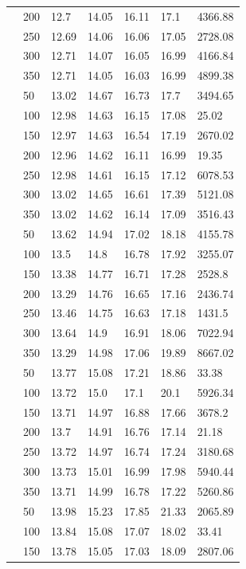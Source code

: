 \documentclass[12pt,a4paper,twoside,openany]{report}
\begin{document}
\begin{longtable}{@{} l l l l l l l @{}}
& 200 & 12.7 & 14.05 & 16.11 & 17.1 & 4366.88 \\
& 250 & 12.69 & 14.06 & 16.06 & 17.05 & 2728.08 \\
& 300 & 12.71 & 14.07 & 16.05 & 16.99 & 4166.84 \\
& 350 & 12.71 & 14.05 & 16.03 & 16.99 & 4899.38 \\
\hline
\pagebreak[4]
40 & 50 & 13.02 & 14.67 & 16.73 & 17.7 & 3494.65 \\
& 100 & 12.98 & 14.63 & 16.15 & 17.08 & 25.02 \\
& 150 & 12.97 & 14.63 & 16.54 & 17.19 & 2670.02 \\
& 200 & 12.96 & 14.62 & 16.11 & 16.99 & 19.35 \\
& 250 & 12.98 & 14.61 & 16.15 & 17.12 & 6078.53 \\
& 300 & 13.02 & 14.65 & 16.61 & 17.39 & 5121.08 \\
& 350 & 13.02 & 14.62 & 16.14 & 17.09 & 3516.43 \\
\hline
\pagebreak[2]
50 & 50 & 13.62 & 14.94 & 17.02 & 18.18 & 4155.78 \\
& 100 & 13.5 & 14.8 & 16.78 & 17.92 & 3255.07 \\
& 150 & 13.38 & 14.77 & 16.71 & 17.28 & 2528.8 \\
& 200 & 13.29 & 14.76 & 16.65 & 17.16 & 2436.74 \\
& 250 & 13.46 & 14.75 & 16.63 & 17.18 & 1431.5 \\
& 300 & 13.64 & 14.9 & 16.91 & 18.06 & 7022.94 \\
& 350 & 13.29 & 14.98 & 17.06 & 19.89 & 8667.02 \\
\hline
\pagebreak[3]
60 & 50 & 13.77 & 15.08 & 17.21 & 18.86 & 33.38 \\
& 100 & 13.72 & 15.0 & 17.1 & 20.1 & 5926.34 \\
& 150 & 13.71 & 14.97 & 16.88 & 17.66 & 3678.2 \\
& 200 & 13.7 & 14.91 & 16.76 & 17.14 & 21.18 \\
& 250 & 13.72 & 14.97 & 16.74 & 17.24 & 3180.68 \\
& 300 & 13.73 & 15.01 & 16.99 & 17.98 & 5940.44 \\
& 350 & 13.71 & 14.99 & 16.78 & 17.22 & 5260.86 \\
\hline
\pagebreak[3]
70 & 50 & 13.98 & 15.23 & 17.85 & 21.33 & 2065.89 \\
& 100 & 13.84 & 15.08 & 17.07 & 18.02 & 33.41 \\
& 150 & 13.78 & 15.05 & 17.03 & 18.09 & 2807.06 \\

\end{longtable}
\end{document}
